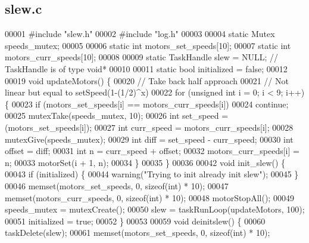 \subsection{slew.\+c}
\label{slew_8c_source}

\begin{DoxyCode}
00001 \textcolor{preprocessor}{#include "slew.h"}
00002 \textcolor{preprocessor}{#include "log.h"}
00003 
00004 \textcolor{keyword}{static} Mutex speeds_mutex;
00005 
00006 \textcolor{keyword}{static} \textcolor{keywordtype}{int} motors_set_speeds[10];
00007 \textcolor{keyword}{static} \textcolor{keywordtype}{int} motors_curr_speeds[10];
00008 
00009 \textcolor{keyword}{static} TaskHandle slew = NULL; \textcolor{comment}{// TaskHandle is of type void*}
00010 
00011 \textcolor{keyword}{static} \textcolor{keywordtype}{bool} initialized = \textcolor{keyword}{false};
00012 
00019 \textcolor{keywordtype}{void} updateMotors() \{
00020   \textcolor{comment}{// Take back half approach}
00021   \textcolor{comment}{// Not linear but equal to setSpeed(1-(1/2)^x)}
00022   \textcolor{keywordflow}{for} (\textcolor{keywordtype}{unsigned} \textcolor{keywordtype}{int} i = 0; i < 9; i++) \{
00023     \textcolor{keywordflow}{if} (motors_set_speeds[i] == motors_curr_speeds[i])
00024       \textcolor{keywordflow}{continue};
00025     mutexTake(speeds_mutex, 10);
00026     \textcolor{keywordtype}{int} set\_speed = (motors_set_speeds[i]);
00027     \textcolor{keywordtype}{int} curr\_speed = motors_curr_speeds[i];
00028     mutexGive(speeds_mutex);
00029     \textcolor{keywordtype}{int} diff = set\_speed - curr\_speed;
00030     \textcolor{keywordtype}{int} offset = diff;
00031     \textcolor{keywordtype}{int} n = curr\_speed + offset;
00032     motors_curr_speeds[i] = n;
00033     motorSet(i + 1, n);
00034   \}
00035 \}
00036 
00042 \textcolor{keywordtype}{void} init_slew() \{
00043   \textcolor{keywordflow}{if} (initialized) \{
00044     warning(\textcolor{stringliteral}{"Trying to init already init slew"});
00045   \}
00046   memset(motors_set_speeds, 0, \textcolor{keyword}{sizeof}(\textcolor{keywordtype}{int}) * 10);
00047   memset(motors_curr_speeds, 0, \textcolor{keyword}{sizeof}(\textcolor{keywordtype}{int}) * 10);
00048   motorStopAll();
00049   speeds_mutex = mutexCreate();
00050   slew = taskRunLoop(updateMotors, 100);
00051   initialized = \textcolor{keyword}{true};
00052 \}
00053 
00059 \textcolor{keywordtype}{void} deinitslew() \{
00060   taskDelete(slew);
00061   memset(motors_set_speeds, 0, \textcolor{keyword}{sizeof}(\textcolor{keywordtype}{int}) * 10);

\end{DoxyCode}
